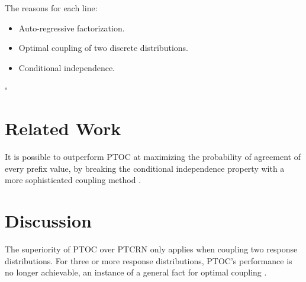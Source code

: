 \documentclass{article}
\begin{document}
The reasons for each line:
\begin{itemize}
    \item Auto-regressive factorization.
    \item Optimal coupling of two discrete distributions.
    \item Conditional independence.
\end{itemize}
\hfill \(\square\)

\section*{Related Work}

It is possible to outperform PTOC at maximizing the probability of agreement of every prefix value,
by breaking the conditional independence property with a more sophisticated coupling method \cite{sun2024blockverificationacceleratesspeculative_v1} \cite{sharpe2024blogapoc}.

\section*{Discussion}

The superiority of PTOC over PTCRN only applies when coupling two response distributions. For three or more response distributions, PTOC's performance is no longer achievable, an instance of a general fact for optimal coupling \cite{angel2021pairwiseoptimalcouplingmultiple}.

\printbibliography
\end{document}
